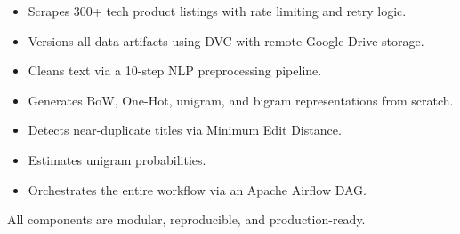 \documentclass[12pt,a4paper]{article}
\begin{document}
\begin{itemize}
  \item Scrapes 300+ tech product listings with rate limiting and retry logic.
  \item Versions all data artifacts using DVC with remote Google Drive storage.
  \item Cleans text via a 10-step NLP preprocessing pipeline.
  \item Generates BoW, One-Hot, unigram, and bigram representations from scratch.
  \item Detects near-duplicate titles via Minimum Edit Distance.
  \item Estimates unigram probabilities.
  \item Orchestrates the entire workflow via an Apache Airflow DAG.
\end{itemize}

All components are modular, reproducible, and production-ready.
\end{document}
